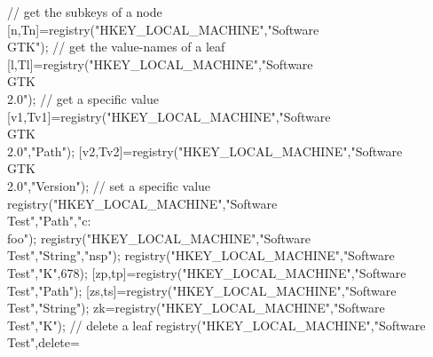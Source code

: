 \begin{examples}
  \begin{nspcode}
    // get the subkeys of a node 
    [n,Tn]=registry("HKEY_LOCAL_MACHINE","Software\\GTK");
    // get the value-names of a leaf 
    [l,Tl]=registry("HKEY_LOCAL_MACHINE","Software\\GTK\\2.0");
    // get a specific value 
    [v1,Tv1]=registry("HKEY_LOCAL_MACHINE","Software\\GTK\\2.0","Path");
    [v2,Tv2]=registry("HKEY_LOCAL_MACHINE","Software\\GTK\\2.0","Version");
    // set a specific value 
    registry("HKEY_LOCAL_MACHINE","Software\\Test","Path","c:\\foo");
    registry("HKEY_LOCAL_MACHINE","Software\\Test","String","nsp");
    registry("HKEY_LOCAL_MACHINE","Software\\Test","K",678);
    [zp,tp]=registry("HKEY_LOCAL_MACHINE","Software\\Test","Path");
    [zs,ts]=registry("HKEY_LOCAL_MACHINE","Software\\Test","String");
    zk=registry("HKEY_LOCAL_MACHINE","Software\\Test","K");
    // delete a leaf 
    registry("HKEY_LOCAL_MACHINE","Software\\Test",delete=%
  \end{nspcode}
\end{examples}


